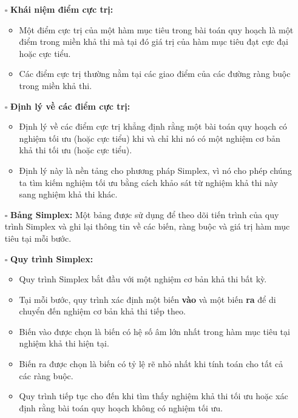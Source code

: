 \documentclass{article}
\begin{document}
\begin{itemize}
\begin{itemize}[label=\textbullet]
        \end{itemize}
    \item [$\square$] \textbf{Khái niệm điểm cực trị:}
    \begin{itemize}[label=\textbullet]
        \item Một điểm cực trị của một hàm mục tiêu trong bài toán quy hoạch là một điểm trong miền khả thi mà tại đó giá trị của hàm mục tiêu đạt cực đại hoặc cực tiểu.
        \item Các điểm cực trị thường nằm tại các giao điểm của các đường ràng buộc trong miền khả thi.
    \end{itemize}
    \item [$\square$] \textbf{Định lý về các điểm cực trị:}
    \begin{itemize}[label=\textbullet]
        \item Định lý về các điểm cực trị khẳng định rằng một bài toán quy hoạch có nghiệm tối ưu (hoặc cực tiểu) khi và chỉ khi nó có một nghiệm cơ bản khả thi tối ưu (hoặc cực tiểu).
        \item Định lý này là nền tảng cho phương pháp Simplex, vì nó cho phép chúng ta tìm kiếm nghiệm tối ưu bằng cách khảo sát từ nghiệm khả thi này sang nghiệm khả thi khác.
    \end{itemize} 
    \item [$\square$] \textbf{Bảng Simplex:} Một bảng được sử dụng để theo dõi tiến trình của quy trình Simplex và ghi lại thông tin về các biến, ràng buộc và giá trị hàm mục tiêu tại mỗi bước.
    \item [$\square$] \textbf{Quy trình Simplex:}
    \begin{itemize}[label=\textbullet]
        \item Quy trình Simplex bắt đầu với một nghiệm cơ bản khả thi bất kỳ.
        \item Tại mỗi bước, quy trình xác định một biến \textbf{vào} và một biến \textbf{ra} để di chuyển đến nghiệm cơ bản khả thi tiếp theo.
        \item Biến vào được chọn là biến có hệ số âm lớn nhất trong hàm mục tiêu tại nghiệm khả thi hiện tại.
        \item Biến ra được chọn là biến có tỷ lệ rẽ nhỏ nhất khi tính toán cho tất cả các ràng buộc.
        \item Quy trình tiếp tục cho đến khi tìm thấy nghiệm khả thi tối ưu hoặc xác định rằng bài toán quy hoạch không có nghiệm tối ưu.
    \end{itemize}
\end{itemize}
\end{document}
